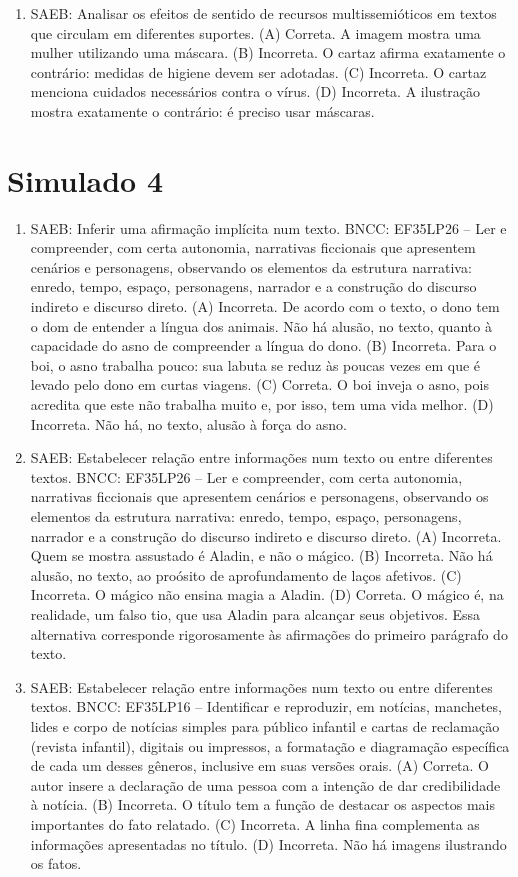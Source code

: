 \begin{enumerate}
\item
SAEB: Analisar os efeitos de sentido de recursos multissemióticos em textos que circulam em diferentes suportes. 
(A) Correta. A imagem mostra uma mulher utilizando uma máscara. 
(B) Incorreta. O cartaz afirma exatamente o contrário: medidas de higiene devem ser adotadas. 
(C) Incorreta. O cartaz menciona cuidados necessários contra o vírus. 
(D) Incorreta. A ilustração mostra exatamente o contrário: é preciso
usar máscaras.
\end{enumerate}

\section*{Simulado 4}

\begin{enumerate}
\item
SAEB: Inferir uma afirmação implícita num texto. BNCC: EF35LP26 -- Ler e compreender, com certa autonomia, narrativas ficcionais que apresentem cenários e personagens, observando os elementos da estrutura narrativa: enredo, tempo, espaço, personagens, narrador e a construção do discurso indireto e discurso direto. 
(A) Incorreta. De acordo com o texto, o dono tem o dom de entender a língua dos animais. Não há alusão, no texto, quanto à capacidade do asno de compreender a língua do dono. 
(B) Incorreta. Para o boi, o asno trabalha pouco: sua labuta se reduz às poucas vezes em que é levado pelo dono em curtas viagens. 
(C) Correta. O boi inveja o asno, pois acredita que este não trabalha muito e, por isso, tem uma vida melhor.
(D) Incorreta. Não há, no texto, alusão à força do asno.

\item
SAEB: Estabelecer relação entre informações num texto ou entre diferentes textos. BNCC: EF35LP26 -- Ler e compreender, com certa autonomia, narrativas ficcionais que apresentem cenários e personagens, observando os elementos da estrutura narrativa: enredo, tempo, espaço, personagens, narrador e a construção do discurso indireto e discurso direto. 
(A) Incorreta. Quem se mostra assustado é Aladin, e não o mágico. 
(B) Incorreta. Não há alusão, no texto, ao proósito de aprofundamento de laços afetivos.
(C) Incorreta. O mágico não ensina magia a Aladin. 
(D) Correta. O mágico é, na realidade, um falso tio, que usa Aladin para alcançar seus objetivos. Essa alternativa corresponde rigorosamente às afirmações do primeiro parágrafo do texto.

\item
SAEB: Estabelecer relação entre informações num texto ou entre diferentes textos. BNCC: EF35LP16 -- Identificar e reproduzir, em notícias, manchetes, lides e corpo de notícias simples para público infantil e cartas de reclamação (revista infantil), digitais ou impressos, a formatação e diagramação específica de cada um desses gêneros, inclusive em suas versões orais. 
(A) Correta. O autor insere a declaração de uma pessoa com a intenção de dar credibilidade à notícia. 
(B) Incorreta. O título tem a função de destacar os aspectos mais importantes do fato relatado. 
(C) Incorreta. A linha fina complementa as informações apresentadas no título. 
(D) Incorreta. Não há imagens ilustrando os fatos.


\end{enumerate}
